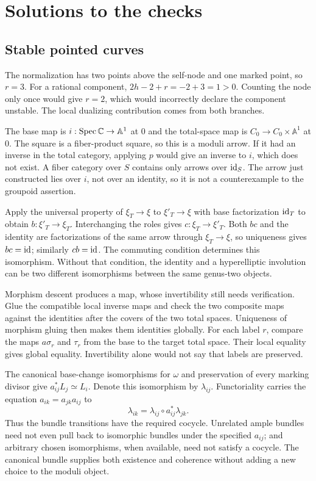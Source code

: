 \chapter{Solutions to the checks}\label{app:solutions}

\section{Stable pointed curves}

The normalization has two points above the self-node and one
marked point, so $r=3$. For a rational component,
$2h-2+r=-2+3=1>0$. Counting the node only once would give
$r=2$, which would incorrectly declare the component unstable.
The local dualizing contribution comes from both branches.

The base map is $i:\operatorname{Spec}\mathbb C\to\mathbb A^1$ at $0$ and the
total-space map is $C_0\to C_0\times\mathbb A^1$ at $0$.
The square is a fiber-product square, so this is a moduli arrow.
If it had an inverse in the total category, applying $p$ would
give an inverse to $i$, which does not exist. A fiber category
over $S$ contains only arrows over $\operatorname{id}_S$. The arrow just
constructed lies over $i$, not over an identity, so it is not
a counterexample to the groupoid assertion.

Apply the universal property of $\xi_T\to\xi$ to
$\xi'_T\to\xi$ with base factorization $\operatorname{id}_T$ to obtain
$b:\xi'_T\to\xi_T$. Interchanging the roles gives
$c:\xi_T\to\xi'_T$. Both $bc$ and the identity are
factorizations of the same arrow through $\xi_T\to\xi$,
so uniqueness gives $bc=\operatorname{id}$; similarly $cb=\operatorname{id}$.
The commuting condition determines this isomorphism. Without
that condition, the identity and a hyperelliptic involution
can be two different isomorphisms between the same genus-two
objects.

Morphism descent produces a map, whose invertibility still
needs verification. Glue the compatible local inverse maps
and check the two composite maps against the identities
after the covers of the two total spaces. Uniqueness of
morphism gluing then makes them identities globally.
For each label $r$, compare the maps $a\sigma_r$ and
$\tau_r$ from the base to the target total space. Their
local equality gives global equality. Invertibility alone
would not say that labels are preserved.

The canonical base-change isomorphisms for $\omega$ and
preservation of every marking divisor give
$a_{ij}^*L_j\simeq L_i$. Denote this isomorphism by
$\lambda_{ij}$. Functoriality carries the equation
$a_{ik}=a_{jk}a_{ij}$ to
\[
             \lambda_{ik}=\lambda_{ij}\circ a_{ij}^*\lambda_{jk}.
\]
Thus the bundle transitions have the required cocycle.
Unrelated ample bundles need not even pull back to isomorphic
bundles under the specified $a_{ij}$; and arbitrary chosen
isomorphisms, when available, need not satisfy a cocycle.
The canonical bundle supplies both existence and coherence
without adding a new choice to the moduli object.

